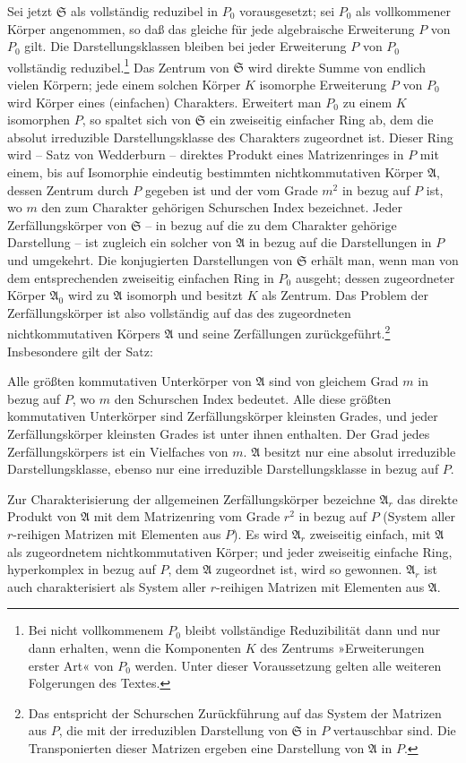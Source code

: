 \documentclass[11pt]{article}
\providecommand{\mS}{\mathfrak{S}}
\providecommand{\mA}{\mathfrak{A}}
\begin{document}
Sei jetzt $\mS$ als vollständig reduzibel in $P_0$ vorausgesetzt; sei $P_0$ als vollkommener Körper angenommen, so daß das gleiche für jede algebraische Erweiterung $P$ von $P_0$ gilt. Die Darstellungsklassen bleiben bei jeder Erweiterung $P$ von $P_0$ vollständig reduzibel.\footnote{Bei nicht vollkommenem $P_0$ bleibt vollständige Reduzibilität dann und nur dann erhalten, wenn die Komponenten $K$ des Zentrums »Erweiterungen erster Art« von $P_0$ werden. Unter dieser Voraussetzung gelten alle weiteren Folgerungen des Textes.} Das Zentrum von $\mS$ wird direkte Summe von endlich vielen Körpern; jede einem solchen Körper $K$ isomorphe Erweiterung $P$ von $P_0$ wird Körper eines (einfachen) Charakters. Erweitert man $P_0$ zu einem $K$ isomorphen $P$, so spaltet sich von $\mS$ ein zweiseitig einfacher Ring ab, dem die absolut irreduzible Darstellungsklasse des Charakters zugeordnet ist. Dieser Ring wird -- Satz von Wedderburn -- direktes Produkt eines Matrizenringes in $P$ mit einem, bis auf Isomorphie eindeutig bestimmten nichtkommutativen Körper $\mA$, dessen Zentrum durch $P$ gegeben ist und der vom Grade $m^2$ in bezug auf $P$ ist, wo $m$ den zum Charakter gehörigen Schurschen Index bezeichnet. Jeder Zerfällungskörper von $\mS$ -- in bezug auf die zu dem Charakter gehörige Darstellung -- ist zugleich ein solcher von $\mA$ in bezug auf die Darstellungen in $P$ und umgekehrt. Die konjugierten Darstellungen von $\mS$ erhält man, wenn man von dem entsprechenden zweiseitig einfachen Ring in $P_0$ ausgeht; dessen zugeordneter Körper $\mA_0$ wird zu $\mA$ isomorph und besitzt $K$ als Zentrum. Das Problem der Zerfällungskörper ist also vollständig auf das des zugeordneten nichtkommutativen Körpers $\mA$ und seine Zerfällungen zurückgeführt.\footnote{Das entspricht der Schurschen Zurückführung auf das System der Matrizen aus $P$, die mit der irreduziblen Darstellung von $\mS$ in $P$ vertauschbar sind. Die Transponierten dieser Matrizen ergeben eine Darstellung von $\mA$ in $P$.} Insbesondere gilt der Satz:

Alle größten kommutativen Unterkörper von $\mA$ sind von gleichem Grad $m$ in bezug auf $P$, wo $m$ den Schurschen Index bedeutet. Alle diese größten kommutativen Unterkörper sind Zerfällungskörper kleinsten Grades, und jeder Zerfällungskörper kleinsten Grades ist unter ihnen enthalten. Der Grad jedes Zerfällungskörpers ist ein Vielfaches von $m$. $\mA$ besitzt nur eine absolut irreduzible Darstellungsklasse, ebenso nur eine irreduzible Darstellungsklasse in bezug auf $P$.

Zur Charakterisierung der allgemeinen Zerfällungskörper bezeichne $\mA_r$ das direkte Produkt von $\mA$ mit dem Matrizenring vom Grade $r^2$ in bezug auf $P$ (System aller $r$-reihigen Matrizen mit Elementen aus $P$). Es wird $\mA_r$ zweiseitig einfach, mit $\mA$ als zugeordnetem nichtkommutativen Körper; und jeder zweiseitig einfache Ring, hyperkomplex in bezug auf $P$, dem $\mA$ zugeordnet ist, wird so gewonnen. $\mA_r$ ist auch charakterisiert als System aller $r$-reihigen Matrizen mit Elementen aus $\mA$.
\end{document}
